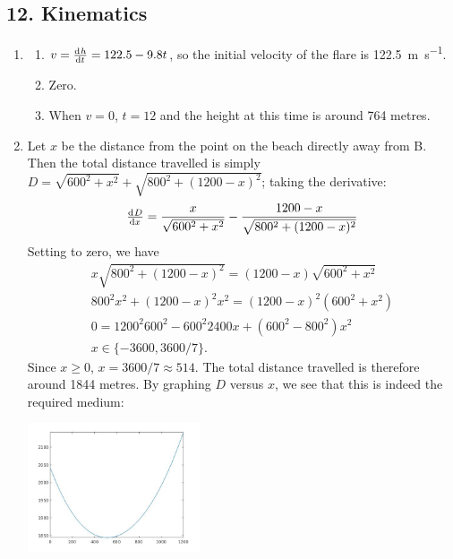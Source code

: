 \subsection*{12. Kinematics}
\begin{enumerate}
  \item
    \begin{enumerate}
      \item $ v = \od{h}{t} = 122.5 - 9.8t $, so the initial velocity of the flare is \SI{122.5}{\metre\per\second}.
      \item Zero.
      \item When $ v = 0 $, $ t = 12 $ and the height at this time is around 764 metres.
    \end{enumerate}
  \item Let $ x $ be the distance from the point on the beach directly away from B. Then the total distance travelled
        is simply $ D = \sqrt{600^2 + x^2} + \sqrt{800^2 + (1200-x)^2} $; taking the derivative:
        \begin{displaymath}
          \od{D}{x} = \frac{x}{\sqrt{600^2 + x^2}} - \frac{1200 - x}{\sqrt{800^2 + (1200 - x)^2}}
        \end{displaymath}
        Setting to zero, we have
        \begin{gather*}
          x\sqrt{800^2 + (1200 - x)^2} = (1200 - x)\sqrt{600^2 + x^2}\\
          800^2 x^2 + (1200 - x)^2 x^2 = (1200 - x)^2 (600^2 + x^2)\\
          0 =  1200^2 600^2 - 600^2 2400x + (600^2 - 800^2) x^2\\
          x \in \{ -3600, 3600/7 \}.
        \end{gather*}
        Since $ x \geq 0 $, $ x = 3600/7 \approx 514 $. The total distance travelled is therefore around 1844 metres. By graphing $ D $ versus $ x $,
        we see that this is indeed the required medium:
        \begin{center}
          \includegraphics[width=0.4\textwidth]{swamp}
        \end{center}
\end{enumerate}

